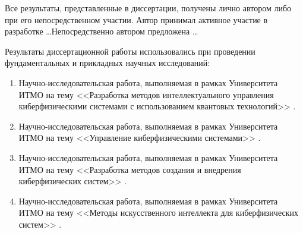 {\contribution} Все результаты, представленные в диссертации, получены лично автором либо при его непосредственном участии. Автор принимал активное участие в разработке \dots Непосредственно автором предложена \dots

{\implementation} Результаты диссертационной работы использовались при проведении фундаментальных и прикладных научных исследований:

\begin{enumerate}[beginpenalty=10000]
	\item Научно-исследовательская работа, выполняемая в рамках Университета ИТМО на тему <<Разработка методов интеллектуального управления киберфизическими системами с использованием квантовых технологий>>  .
	\item Научно-исследовательская работа, выполняемая в рамках Университета ИТМО на тему <<Управление киберфизическими системами>>  .
	\item Научно-исследовательская работа, выполняемая в рамках Университета ИТМО на тему <<Разработка методов создания и внедрения киберфизических систем>>  .
	\item Научно-исследовательская работа, выполняемая в рамках Университета ИТМО на тему <<Методы искусственного интеллекта для киберфизических систем>>  .
\end{enumerate}


